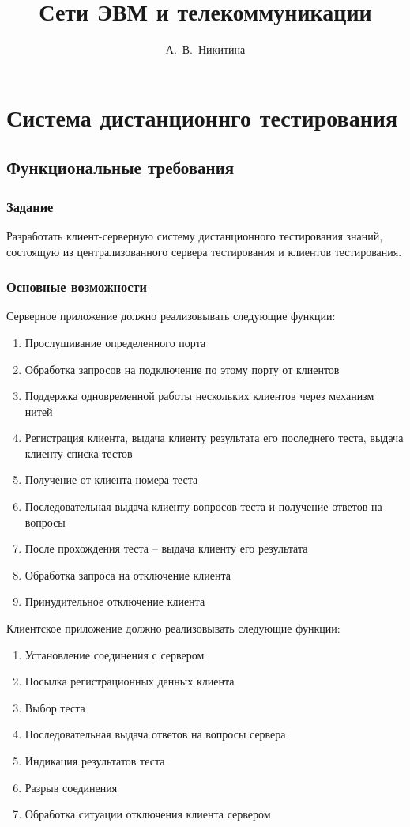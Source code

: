 \documentclass[12pt,a4paper]{report}
\author{А.~В.~Никитина}
\title{Сети ЭВМ и телекоммуникации}
\begin{document}
\listoftodos
\maketitle
\chapter{Система дистанционнго тестирования}
\section{Функциональные требования}
\subsection{Задание}
Разработать клиент-серверную систему дистанционного тестирования знаний, состоящую из централизованного сервера тестирования и клиентов тестирования.
\subsection{Основные возможности}
Серверное приложение должно реализовывать следующие функции:
\begin{enumerate}
\item{Прослушивание определенного порта}
\item{Обработка запросов на подключение по этому порту от клиентов}
\item{Поддержка одновременной работы нескольких клиентов через механизм нитей}
\item{Регистрация клиента, выдача клиенту результата его последнего теста, выдача клиенту списка тестов}
\item{Получение от клиента номера теста}
\item{Последовательная выдача клиенту вопросов теста и получение ответов на вопросы}
\item{После прохождения теста – выдача клиенту его результата}
\item{Обработка запроса на отключение клиента}
\item{Принудительное отключение клиента}
\end{enumerate}

Клиентское приложение должно реализовывать следующие функции:
\begin{enumerate}
\item{Установление соединения с сервером}
\item{Посылка регистрационных данных клиента}
\item{Выбор теста}
\item{Последовательная выдача ответов на вопросы сервера}
\item{Индикация результатов теста}
\item{Разрыв соединения}
\item{Обработка ситуации отключения клиента сервером}
\end{enumerate}
\end{document}

